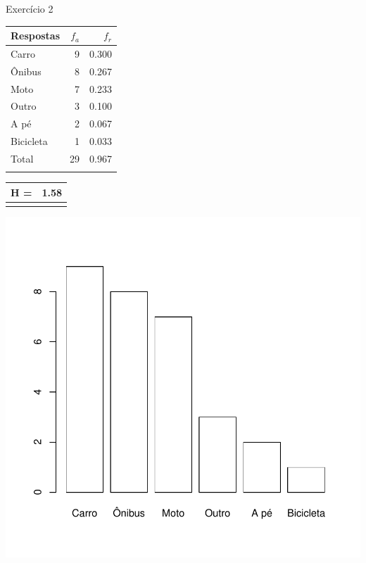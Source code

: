 \documentclass[
  ignorenonframetext,
  serif,
  professionalfont,
  usenames,
  dvipsnames,
  aspectratio = 169]{beamer}
\def\beginAHalfColumn{\begin{minipage}{0.49\textwidth}}%
\def\endColumns{\end{minipage}}%
\begin{document}
\begin{frame}{Exercício 2}
\label{exercuxedcio-2-3}
\beginAHalfColumn

\begin{longtable}[]{@{}lrr@{}}
\toprule\noalign{}
Respostas & \(f_a\) & \(f_r\) \\
\midrule\noalign{}
\endhead
Carro & 9 & 0.300 \\
Ônibus & 8 & 0.267 \\
Moto & 7 & 0.233 \\
Outro & 3 & 0.100 \\
A pé & 2 & 0.067 \\
Bicicleta & 1 & 0.033 \\
Total & 29 & 0.967 \\
\bottomrule\noalign{}
\end{longtable}

\begin{longtable}[]{@{}lr@{}}
\toprule\noalign{}
\endhead
H = & 1.58 \\
\bottomrule\noalign{}
\end{longtable}

\endColumns
\beginAHalfColumn

\begin{center}\includegraphics[width=0.9\linewidth]{exercicios-encontro2-solucao_files/figure-beamer/unnamed-chunk-13-1} \end{center}

\endColumns
\end{frame}
\end{document}
